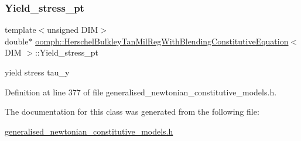 \mbox{\label{classoomph_1_1HerschelBulkleyTanMilRegWithBlendingConstitutiveEquation_ae1cc26fc86dfffdc1b38910aa8dfc6d9}} 
\subsubsection{\texorpdfstring{Yield\+\_\+stress\+\_\+pt}{Yield\_stress\_pt}}
{\footnotesize\ttfamily template$<$unsigned D\+IM$>$ \\
double$\ast$ \hyperlink{classoomph_1_1HerschelBulkleyTanMilRegWithBlendingConstitutiveEquation}{oomph\+::\+Herschel\+Bulkley\+Tan\+Mil\+Reg\+With\+Blending\+Constitutive\+Equation}$<$ D\+IM $>$\+::Yield\+\_\+stress\+\_\+pt\hspace{0.3cm}{\ttfamily [private]}}



yield stress tau\+\_\+y 



Definition at line 377 of file generalised\+\_\+newtonian\+\_\+constitutive\+\_\+models.\+h.



The documentation for this class was generated from the following file\+:\begin{DoxyCompactItemize}
\item 
\hyperlink{generalised__newtonian__constitutive__models_8h}{generalised\+\_\+newtonian\+\_\+constitutive\+\_\+models.\+h}\end{DoxyCompactItemize}
